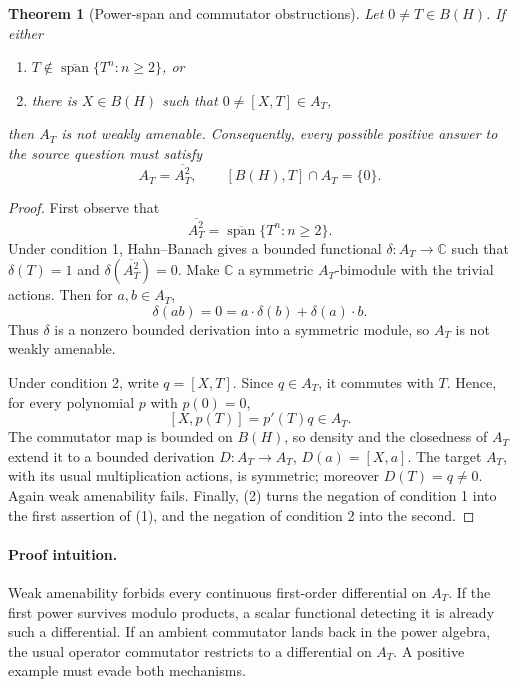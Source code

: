 \documentclass[11pt]{article}
\newtheorem{theorem}{Theorem}
\newcommand{\C}{\mathbb C}
\newcommand{\AT}{A_T}
\begin{document}
\begin{theorem}[Power-span and commutator obstructions]
\label{thm:obstructions}
Let \(0\ne T\in B(H)\).  If either
\begin{enumerate}
\item \(T\notin\overline{\operatorname{span}}\{T^n:n\ge2\}\), or
\item there is \(X\in B(H)\) such that
      \(0\ne[X,T]\in\AT\),
\end{enumerate}
then \(\AT\) is not weakly amenable.
Consequently, every possible positive answer to the source question must
satisfy
\[
 \AT=\overline{\AT^2},
 \qquad [B(H),T]\cap\AT=\{0\}.
 \tag{1}
\]
\end{theorem}

\begin{proof}
First observe that
\[
 \overline{\AT^2}
 =\overline{\operatorname{span}}\{T^n:n\ge2\}.
 \tag{2}
\]
Under condition 1, Hahn--Banach gives a bounded functional
\(\delta:\AT\to\C\) such that \(\delta(T)=1\) and
\(\delta(\overline{\AT^2})=0\).  Make \(\C\) a symmetric \(\AT\)-bimodule
with the trivial actions.  Then for \(a,b\in\AT\),
\[
 \delta(ab)=0=a\cdot\delta(b)+\delta(a)\cdot b.
\]
Thus \(\delta\) is a nonzero bounded derivation into a symmetric module, so
\(\AT\) is not weakly amenable.

Under condition 2, write \(q=[X,T]\).  Since \(q\in\AT\), it commutes with
\(T\).  Hence, for every polynomial \(p\) with \(p(0)=0\),
\[
 [X,p(T)]=p'(T)q\in\AT. \tag{3}
\]
The commutator map is bounded on \(B(H)\), so density and the closedness of
\(\AT\) extend it to a bounded derivation
\(D:\AT\to\AT\), \(D(a)=[X,a]\).  The target \(\AT\), with its usual
multiplication actions, is symmetric; moreover \(D(T)=q\ne0\).  Again weak
amenability fails.  Finally, (2) turns the negation of condition 1 into the
first assertion of (1), and the negation of condition 2 into the second.
\end{proof}

\paragraph{Proof intuition.}
Weak amenability forbids every continuous first-order differential on
\(\AT\).  If the first power survives modulo products, a scalar functional
detecting it is already such a differential.  If an ambient commutator
lands back in the power algebra, the usual operator commutator restricts to
a differential on \(\AT\).  A positive example must evade both mechanisms.
\end{document}
